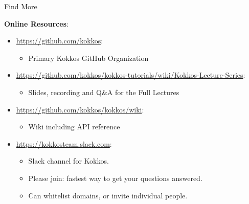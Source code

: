 \begin{frame}{Find More}

\textbf{Online Resources}:

\begin{itemize}
        \item \url{https://github.com/kokkos}:
                \begin{itemize}
                        \item Primary Kokkos GitHub Organization
                \end{itemize}
        \item \url{https://github.com/kokkos/kokkos-tutorials/wiki/Kokkos-Lecture-Series}:
                \begin{itemize}
			\item{Slides, recording and Q\&A for the Full Lectures}
                \end{itemize}
        \item \url{https://github.com/kokkos/kokkos/wiki}:
                \begin{itemize}
                        \item Wiki including API reference
                \end{itemize}
        \item \url{https://kokkosteam.slack.com}:
                \begin{itemize}
                        \item Slack channel for Kokkos.
                        \item Please join: fastest way to get your questions answered.
                        \item Can whitelist domains, or invite individual people.
                \end{itemize}
\end{itemize}

\end{frame}



